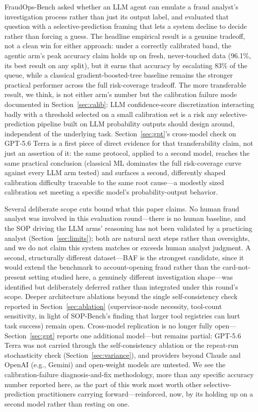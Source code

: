 \documentclass[]{ieeeaccess}
\begin{document}
FraudOps-Bench asked whether an LLM agent can emulate a fraud analyst's
investigation process rather than just its output label, and evaluated
that question with a selective-prediction framing that lets a system
decline to decide rather than forcing a guess. The headline empirical
result is a genuine tradeoff, not a clean win for either approach: under
a correctly calibrated band, the agentic arm's peak accuracy claim holds
up on fresh, never-touched data (96.1\%, its best result on any split),
but it earns that accuracy by escalating 83\% of the queue, while a
classical gradient-boosted-tree baseline remains the stronger practical
performer across the full risk-coverage tradeoff. The more transferable
result, we think, is not either arm's number but the calibration failure
mode documented in Section~\ref{sec:calib}: LLM confidence-score discretization
interacting badly with a threshold selected on a small calibration set is
a risk any selective-prediction pipeline built on LLM probability outputs
should design around, independent of the underlying task. Section~\ref{sec:gpt}'s
cross-model check on GPT-5.6 Terra is a first piece of direct evidence
for that transferability claim, not just an assertion of it: the same
protocol, applied to a second model, reaches the same practical
conclusion (classical ML dominates the full risk-coverage curve against
every LLM arm tested) and surfaces a second, differently shaped
calibration difficulty traceable to the same root cause---a modestly
sized calibration set meeting a specific model's probability-output
behavior.

Several deliberate scope cuts bound what this paper claims. No human
fraud analyst was involved in this evaluation round---there is no human
baseline, and the SOP driving the LLM arms' reasoning has not been
validated by a practicing analyst (Section~\ref{sec:limits}); both are natural next
steps rather than oversights, and we do not claim this system matches or
exceeds human analyst judgment. A second, structurally different dataset---BAF \cite{baf2022} is the strongest candidate, since it would extend
the benchmark to account-opening fraud rather than the card-not-present
setting studied here, a genuinely different investigation shape---was
identified but deliberately deferred rather than integrated under this
round's scope. Deeper architecture ablations beyond the single
self-consistency check reported in Section~\ref{sec:ablation} (supervisor-node necessity,
tool-count sensitivity, in light of SOP-Bench's \cite{sopbench2025}
finding that larger tool registries can hurt task success) remain open.
Cross-model replication is no longer fully open---Section~\ref{sec:gpt} reports
one additional model---but remains partial: GPT-5.6 Terra was not
carried through the self-consistency ablation or the repeat-run
stochasticity check (Section~\ref{sec:variance}), and providers beyond Claude and OpenAI
(e.g., Gemini) and open-weight models are untested. We see the
calibration-failure diagnosis-and-fix methodology, more than any specific
accuracy number reported here, as the part of this work most worth other
selective-prediction practitioners carrying forward---reinforced, now,
by its holding up on a second model rather than resting on one.
\end{document}
